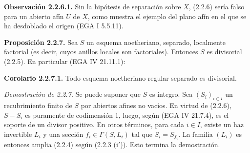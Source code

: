 \textbf{Observación 2.2.6.1.} Sin la hipótesis de separación sobre $X$, (2.2.6) sería falso para un abierto afín $U$ de $X$, como muestra el ejemplo del plano afín en el que se ha desdoblado el origen (EGA I 5.5.11).

\textbf{Proposición 2.2.7.} Sea $S$ un esquema noetheriano, separado, localmente factorial (es decir, cuyos anillos locales son factoriales). Entonces $S$ es divisorial (2.2.5). En particular (EGA IV 21.11.1):

\textbf{Corolario 2.2.7.1.} Todo esquema noetheriano regular separado es divisorial.

\emph{Demostración de 2.2.7.} Se puede suponer que $S$ es íntegro. Sea $(S_i)_{i\in I}$ un recubrimiento finito de $S$ por abiertos afines no vacíos. En virtud de (2.2.6), $S-S_i$ es puramente de codimensión $1$, luego, según (EGA IV 21.7.4), es el soporte de un divisor positivo. En otros términos, para cada $i\in I$, existe un haz invertible $L_i$ y una sección $f_i\in\Gamma(S,L_i)$ tal que $S_i=S_{f_i}$. La familia $(L_i)$ es entonces amplia (2.2.4) según (2.2.3 (i$'$)). Esto termina la demostración.


